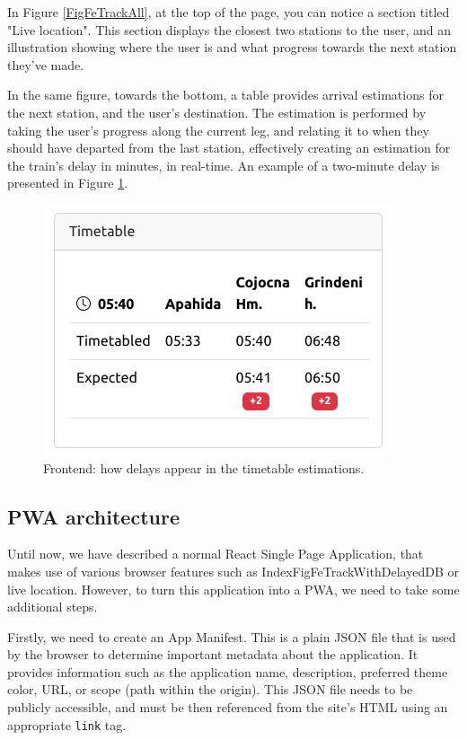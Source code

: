 In Figure \ref{FigFeTrackAll}, at the top of the page, you can notice a section titled "Live location". This section displays the closest two stations to the user, and an illustration showing where the user is and what progress towards the next station they've made.

In the same figure, towards the bottom, a table provides arrival estimations for the next station, and the user's destination. The estimation is performed by taking the user's progress along the current leg, and relating it to when they should have departed from the last station, effectively creating an estimation for the train's delay in minutes, in real-time. An example of a two-minute delay is presented in Figure \ref{FigFeTrackWithDelay}.

\begin{figure}[htbp]
    \centering
    \includegraphics[width=.7\textwidth]{./figures/code/fe_track-with-delay.png}
    \caption{Frontend: how delays appear in the timetable estimations.}
    \label{FigFeTrackWithDelay}
\end{figure}

\subsection{PWA architecture}
Until now, we have described a normal React Single Page Application, that makes use of various browser features such as IndexFigFeTrackWithDelayedDB or live location. However, to turn this application into a PWA, we need to take some additional steps.

Firstly, we need to create an App Manifest. This is a plain JSON file that is used by the browser to determine important metadata about the application. It provides information such as the application name, description, preferred theme color, URL, or scope (path within the origin). This JSON file needs to be publicly accessible, and must be then referenced from the site's HTML using an appropriate \verb|link| tag.

